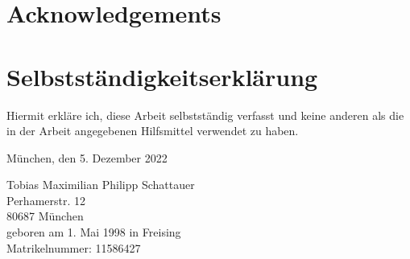 \chapter*{Acknowledgements}



\chapter*{Selbstständigkeitserklärung}
Hiermit erkläre ich, diese Arbeit selbstständig verfasst und keine anderen als die in der Arbeit angegebenen Hilfsmittel verwendet zu haben.

\vspace{5cm}
München, den 5. Dezember 2022

\vspace{3cm}
Tobias Maximilian Philipp Schattauer \\
\ifprintversion
Perhamerstr. 12 \\
80687 München \\
geboren am 1. Mai 1998 in Freising \\
Matrikelnummer: 11586427
\fi